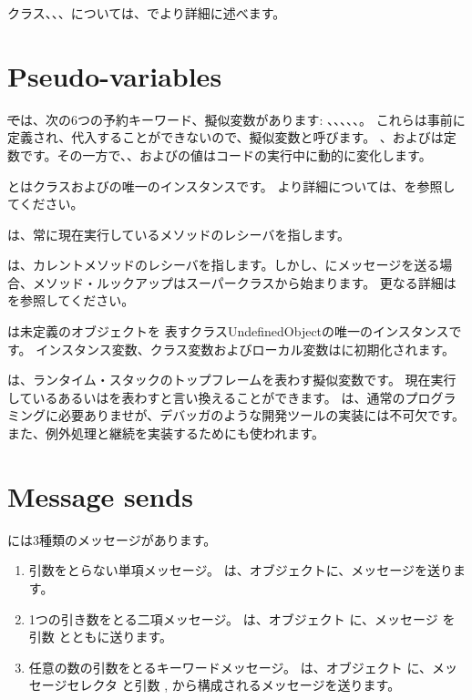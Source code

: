 \documentclass[a4paper,10pt,twoside]{book}
\begin{document}
クラス、、、については、でより詳細に述べます。


\section{Pseudo-variables}

\st では、次の6つの予約キーワード、擬似変数があります:
、、、、、。
これらは事前に定義され、代入することができないので、擬似変数と呼びます。
、およびは定数です。その一方で、、およびの値はコードの実行中に動的に変化します。

とはクラスおよびの唯一のインスタンスです。
より詳細については、を参照してください。

は、常に現在実行しているメソッドのレシーバを指します。

は、カレントメソッドのレシーバを指します。しかし、にメッセージを送る場合、メソッド・ルックアップはスーパークラスから始まります。
更なる詳細はを参照してください。

は未定義のオブジェクトを
表すクラスUndefinedObjectの唯一のインスタンスです。
インスタンス変数、クラス変数およびローカル変数はに初期化されます。

は、ランタイム・スタックのトップフレームを表わす擬似変数です。
現在実行しているあるいはを表わすと言い換えることができます。
は、通常のプログラミングに必要ありませが、デバッガのような開発ツールの実装には不可欠です。また、例外処理と継続を実装するためにも使われます。

\section{Message sends}

\pharo には3種類のメッセージがあります。
\begin{enumerate}
  \item 引数をとらない単項メッセージ。
  は、オブジェクトに、メッセージを送ります。
  \item 1つの引き数をとる二項メッセージ。
  	は、オブジェクト  に、メッセージ \ct{+} を引数  とともに送ります。
  \item 任意の数の引数をとるキーワードメッセージ。
  	 は、オブジェクト  に、メッセージセレクタ
	 と引数 ,  から構成されるメッセージを送ります。
\end{enumerate}
\end{document}
